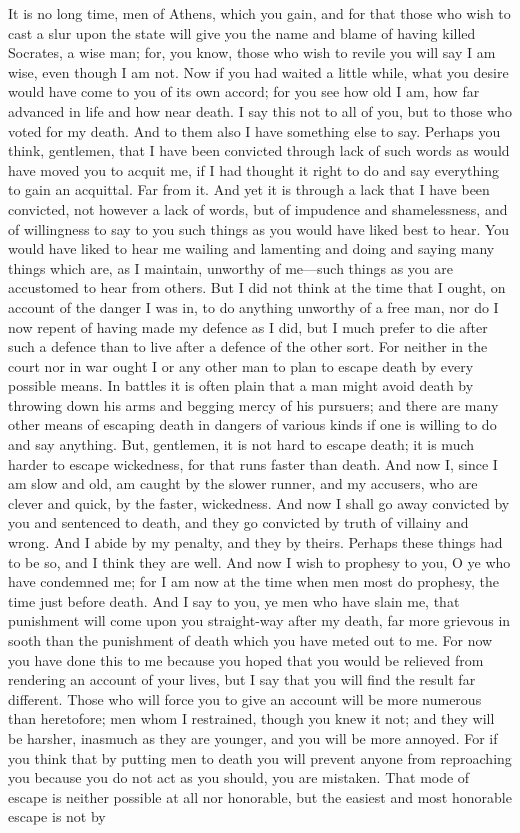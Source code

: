 It is no long time, men of Athens, which you gain, and for that those who wish to cast a slur upon the state will give you the name and blame of having killed Socrates, a wise man; for, you know, those who wish to revile you will say I am wise, even though I am not. Now if you had waited a little while, what you desire would have come to you of its own accord; for you see how old I am, how far advanced in life and how near death. I say this not to all of you,  but to those who voted for my death. And to them also I have something else to say. Perhaps you think, gentlemen, that I have been convicted through lack of such words as would have moved you to acquit me, if I had thought it right to do and say everything to gain an acquittal. Far from it. And yet it is through a lack that I have been convicted, not however a lack of words, but of impudence and shamelessness, and of willingness to say to you such things as you would have liked best to hear. You would have liked to hear me wailing and lamenting and doing and saying  many things which are, as I maintain, unworthy of me—such things as you are accustomed to hear from others. But I did not think at the time that I ought, on account of the danger I was in, to do anything unworthy of a free man, nor do I now repent of having made my defence as I did, but I much prefer to die after such a defence than to live after a defence of the other sort. For neither in the court nor in war ought I  or any other man to plan to escape death by every possible means. In battles it is often plain that a man might avoid death by throwing down his arms and begging mercy of his pursuers; and there are many other means of escaping death in dangers of various kinds if one is willing to do and say anything. But, gentlemen, it is not hard to escape death; it is much harder to escape wickedness, for that runs faster than death.  And now I, since I am slow and old, am caught by the slower runner, and my accusers, who are clever and quick, by the faster, wickedness. And now I shall go away convicted by you and sentenced to death, and they go convicted by truth of villainy and wrong. And I abide by my penalty, and they by theirs. Perhaps these things had to be so, and I think they are well.  And now I wish to prophesy to you, O ye who have condemned me; for I am now at the time when men most do prophesy, the time just before death. And I say to you, ye men who have slain me, that punishment will come upon you straight-way after my death, far more grievous in sooth than the punishment of death which you have meted out to me. For now you have done this to me because you hoped that you would be relieved from rendering an account of your lives, but I say that you will find the result far different. Those who will force you to give an account will be more numerous than heretofore;  men whom I restrained, though you knew it not; and they will be harsher, inasmuch as they are younger, and you will be more annoyed. For if you think that by putting men to death you will prevent anyone from reproaching you because you do not act as you should, you are mistaken. That mode of escape is neither possible at all nor honorable, but the easiest and most honorable escape is not by 